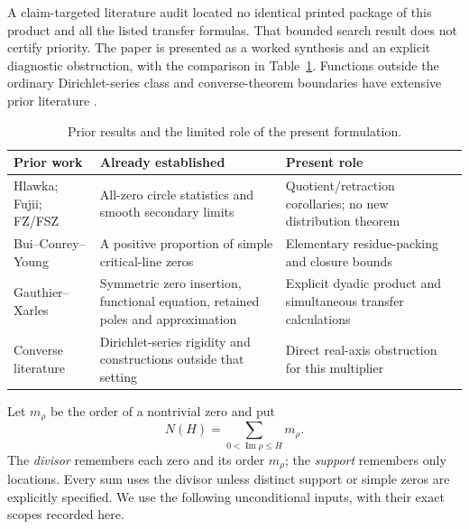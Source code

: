 \documentclass[11pt,a4paper]{article}
\theoremstyle{definition}
\theoremstyle{remark}
\DeclareMathOperator{\Ima}{Im}
\begin{document}
A claim-targeted literature audit located no identical printed package of
this product and all the listed transfer formulas. That bounded search
result does not certify priority. The paper is presented as a worked
synthesis and an explicit diagnostic obstruction, with the comparison in
Table~\ref{tab:prior}. Functions outside the ordinary Dirichlet-series
class and converse-theorem boundaries have extensive prior literature
\cite{KMP,Burnol,Nakamura}.

\begin{table}[tbp]
\centering\small
\caption{Prior results and the limited role of the present formulation.}
\label{tab:prior}
\begin{tabular}{@{}>{\raggedright\arraybackslash}p{.24\linewidth}>{\raggedright\arraybackslash}p{.35\linewidth}>{\raggedright\arraybackslash}p{.34\linewidth}@{}}
\toprule
Prior work & Already established & Present role \\
\midrule
Hlawka; Fujii; FZ/FSZ \cite{FZ,FSZ}
& All-zero circle statistics and smooth secondary limits
& Quotient/retraction corollaries; no new distribution theorem \\
\addlinespace
Bui--Conrey--Young \cite{BCY}
& A positive proportion of simple critical-line zeros
& Elementary residue-packing and closure bounds \\
\addlinespace
Gauthier--Xarles \cite{GX}
& Symmetric zero insertion, functional equation, retained poles and approximation
& Explicit dyadic product and simultaneous transfer calculations \\
\addlinespace
Converse literature \cite{KMP,Burnol,Nakamura}
& Dirichlet-series rigidity and constructions outside that setting
& Direct real-axis obstruction for this multiplier \\
\bottomrule
\end{tabular}
\end{table}

Let $m_\rho$ be the order of a nontrivial zero and put
\[
 N(H)=\sum_{0<\Ima\rho\le H}m_\rho.
\]
The \emph{divisor} remembers each zero and its order $m_\rho$; the
\emph{support} remembers only locations. Every sum uses the divisor unless
distinct support or simple zeros are explicitly specified. We use the
following unconditional inputs, with their exact scopes recorded here.
\end{document}
